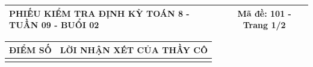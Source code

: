 \documentclass[12pt,a4paper]{article}
\begin{document}
\pagestyle{empty}
\noindent
\begin{tabularx}{\linewidth}{|X|c|}
\hline
\textbf{PHIẾU KIỂM TRA ĐỊNH KỲ TOÁN 8 - TUẦN 09 - BUỔI 02} & \textbf{Mã đề: 101 - Trang 1/2} \\
\hline
\end{tabularx}

\vspace{1.2mm}

\noindent
\begin{tabularx}{\linewidth}{|p{3.2cm}|X|}
\hline
\centering\textbf{ĐIỂM SỐ} & \centering\textbf{LỜI NHẬN XÉT CỦA THẦY CÔ} \tabularnewline
\hline
\rule{0pt}{1.8cm} & \tabularnewline
\hline
\end{tabularx}
\end{document}

